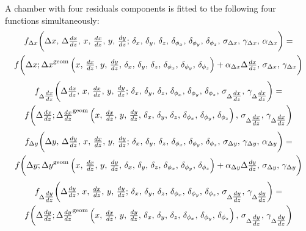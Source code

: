 \documentclass[12pt]{article}
\begin{document}
A chamber with four residuals components is fitted to the following
four functions simultaneously:
\begin{multline}
f_{\Delta x}\bigg(\Delta x, \, \Delta \tfrac{dx}{dz}, \, x, \, \tfrac{dx}{dz}, \, y, \, \tfrac{dy}{dz}; \, \delta_x, \, \delta_y, \, \delta_z, \, \delta_{\phi_x}, \, \delta_{\phi_y}, \, \delta_{\phi_z}, \, \sigma_{\Delta x}, \, \gamma_{\Delta x}, \, \alpha_{\Delta x} \bigg) = \\
f\bigg(\Delta x; {\Delta x}^{\mbox{\scriptsize geom}}\left(x, \, \tfrac{dx}{dz}, \, y, \, \tfrac{dy}{dz}, \, \delta_x, \, \delta_y, \, \delta_z, \, \delta_{\phi_x}, \, \delta_{\phi_y}, \, \delta_{\phi_z}\right) + \alpha_{\Delta x} \Delta \tfrac{dx}{dz}, \, \sigma_{\Delta x}, \, \gamma_{\Delta x}\bigg)
\label{eqn:fitfunction_x}
\end{multline}
\begin{multline}
f_{\Delta \tfrac{dx}{dz}}\bigg(\Delta \tfrac{dx}{dz}, \, x, \, \tfrac{dx}{dz}, \, y, \, \tfrac{dy}{dz}; \, \delta_x, \, \delta_y, \, \delta_z, \, \delta_{\phi_x}, \, \delta_{\phi_y}, \, \delta_{\phi_z}, \, \sigma_{\Delta \tfrac{dx}{dz}}, \, \gamma_{\Delta \tfrac{dx}{dz}} \bigg) = \\
f\bigg(\Delta \tfrac{dx}{dz}; {\Delta \tfrac{dx}{dz}}^{\mbox{\scriptsize geom}}\left(x, \, \tfrac{dx}{dz}, \, y, \, \tfrac{dy}{dz}, \, \delta_x, \, \delta_y, \, \delta_z, \, \delta_{\phi_x}, \, \delta_{\phi_y}, \, \delta_{\phi_z}\right), \, \sigma_{\Delta \tfrac{dx}{dz}}, \, \gamma_{\Delta \tfrac{dx}{dz}}\bigg)
\label{eqn:fitfunction_dxdz}
\end{multline}
\begin{multline}
f_{\Delta y}\bigg(\Delta y, \, \Delta \tfrac{dy}{dz}, \, x, \, \tfrac{dx}{dz}, \, y, \, \tfrac{dy}{dz}; \, \delta_x, \, \delta_y, \, \delta_z, \, \delta_{\phi_x}, \, \delta_{\phi_y}, \, \delta_{\phi_z}, \, \sigma_{\Delta y}, \, \gamma_{\Delta y}, \, \alpha_{\Delta y} \bigg) = \\
f\bigg(\Delta y; {\Delta y}^{\mbox{\scriptsize geom}}\left(x, \, \tfrac{dx}{dz}, \, y, \, \tfrac{dy}{dz}, \, \delta_x, \, \delta_y, \, \delta_z, \, \delta_{\phi_x}, \, \delta_{\phi_y}, \, \delta_{\phi_z}\right) + \alpha_{\Delta y} \Delta \tfrac{dy}{dz}, \, \sigma_{\Delta y}, \, \gamma_{\Delta y}\bigg)
\label{eqn:fitfunction_y}
\end{multline}
\begin{multline}
f_{\Delta \tfrac{dy}{dz}}\bigg(\Delta \tfrac{dy}{dz}, \, x, \, \tfrac{dx}{dz}, \, y, \, \tfrac{dy}{dz}; \, \delta_x, \, \delta_y, \, \delta_z, \, \delta_{\phi_x}, \, \delta_{\phi_y}, \, \delta_{\phi_z}, \, \sigma_{\Delta \tfrac{dy}{dz}}, \, \gamma_{\Delta \tfrac{dy}{dz}} \bigg) = \\
f\bigg(\Delta \tfrac{dy}{dz}; {\Delta \tfrac{dy}{dz}}^{\mbox{\scriptsize geom}}\left(x, \, \tfrac{dx}{dz}, \, y, \, \tfrac{dy}{dz}, \, \delta_x, \, \delta_y, \, \delta_z, \, \delta_{\phi_x}, \, \delta_{\phi_y}, \, \delta_{\phi_z}\right), \, \sigma_{\Delta \tfrac{dy}{dz}}, \, \gamma_{\Delta \tfrac{dy}{dz}}\bigg)
\label{eqn:fitfunction_dydz}
\end{multline}
\end{document}

